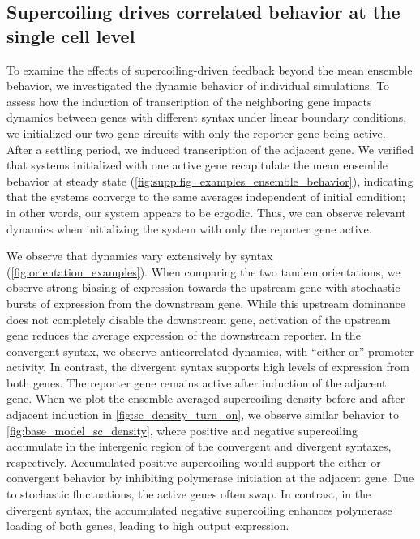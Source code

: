 \documentclass[11pt]{article}
\begin{document}
\FloatBarrier
\subsection{Supercoiling drives correlated behavior at the single cell level}

To examine the effects of supercoiling-driven feedback beyond the mean ensemble behavior, we investigated the dynamic behavior of individual simulations. To assess how the induction of transcription of the neighboring gene impacts dynamics between genes with different syntax under linear boundary conditions,
we initialized our two-gene circuits with only the reporter gene being active. After a settling period, we induced transcription of the adjacent gene.
We verified that systems initialized with one active gene recapitulate the mean ensemble behavior at steady state (\cref{fig:supp:fig_examples_ensemble_behavior}), indicating that the systems converge to the same averages independent of initial condition; in other words, our system appears to be ergodic. Thus, we can observe relevant dynamics when initializing the system with only the reporter gene active. 

We observe that dynamics vary extensively by syntax (\cref{fig:orientation_examples}). When comparing the two tandem orientations, we observe strong biasing of expression towards the upstream gene with stochastic bursts of expression from the downstream gene. While this upstream dominance does not completely disable the downstream gene, activation of the upstream gene reduces the average expression of the downstream reporter. In the convergent syntax, we observe anticorrelated dynamics, with ``either-or'' promoter activity. In contrast, the divergent syntax supports high levels of expression from both genes. The reporter gene remains active after induction of the adjacent gene. When we plot the ensemble-averaged supercoiling density before and after adjacent induction in \cref{fig:sc_density_turn_on}, we observe similar behavior to \cref{fig:base_model_sc_density}, where positive and negative supercoiling accumulate in the intergenic region of the convergent and divergent syntaxes, respectively. Accumulated positive supercoiling would support the either-or convergent behavior by inhibiting polymerase initiation at the adjacent gene. Due to stochastic fluctuations, the active genes often swap. In contrast, in the divergent syntax, the accumulated negative supercoiling enhances polymerase loading of both genes, leading to high output expression.
\end{document}
